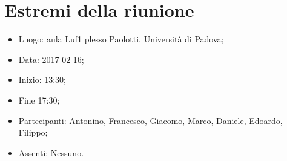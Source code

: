 \documentclass[../verbale-2017-02-16.tex]{subfiles}
\begin{document}
\section{Estremi della riunione}
	\begin{itemize}
		\item Luogo: aula Luf1 plesso Paolotti, Università di Padova;
        \item Data: 2017-02-16;
        \item Inizio: 13:30;
        \item Fine 17:30;
		\item Partecipanti: Antonino, Francesco, Giacomo, Marco, Daniele, Edoardo, Filippo;
        \item Assenti: Nessuno.
	\end{itemize}
\end{document}

